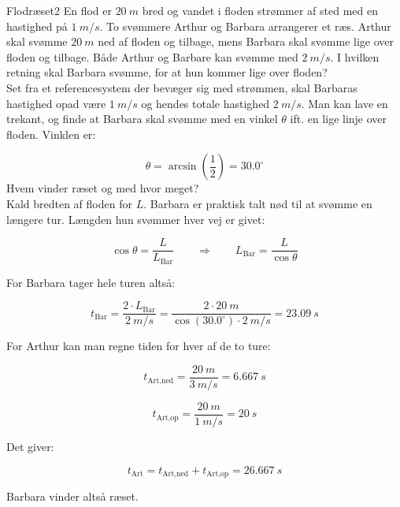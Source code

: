 \documentclass[crop=false, class=memoir]{standalone}
\begin{document}
\begin{opgave}{Flodræset}{2}
	En flod er $\SI{20}{m}$ bred og vandet i floden strømmer af sted med en hastighed på $\SI{1}{m/s}$. To svømmere Arthur og Barbara arrangerer et ræs. Arthur skal svømme $\SI{20}{m}$ ned af floden og tilbage, mens Barbara skal svømme lige over floden og tilbage. Både Arthur og Barbare kan svømme med $\SI{2}{m/s}$.
	\opg I hvilken retning skal Barbara svømme, for at hun kommer lige over floden?\\
	
	Set fra et referencesystem der bevæger sig med strømmen, skal Barbaras hastighed opad være $\SI{1}{m/s}$ og hendes totale hastighed $\SI{2}{m/s}$. Man kan lave en trekant, og finde at Barbara skal svømme med en vinkel $\theta$ ift. en lige linje over floden. Vinklen er:
	
	$$\theta = \arcsin \left( \frac{1}{2} \right) = 30.0^\circ$$
	\opg Hvem vinder ræset og med hvor meget?\\
	
	Kald bredten af floden for $L$. Barbara er praktisk talt nød til at svømme en længere tur. Længden hun svømmer hver vej er givet:
	
	$$\cos \theta = \frac{L}{L_{\text{Bar}}} \quad \quad \Rightarrow \quad \quad L_{\text{Bar}} = \frac{L}{\cos \theta}  $$
	
	\vspace{2mm}
	
	For Barbara tager hele turen altså:
	
	$$t_{\text{Bar}} = \frac{2 \cdot L_{\text{Bar}}}{\SI{2}{m/s}} = \frac{2 \cdot \SI{20}{m}}{\cos \left( 30.0^\circ \right) \cdot \SI{2}{m/s}} = \SI{23.09}{s}$$
	
	\vspace{2mm}
	
	For Arthur kan man regne tiden for hver af de to ture:
	
	$$t_{\text{Art,ned}} = \frac{\SI{20}{m}}{\SI{3}{m/s}} = \SI{6.667}{s}$$
	
	$$t_{\text{Art,op}} = \frac{\SI{20}{m}}{\SI{1}{m/s}} = \SI{20}{s}$$
	
	\vspace{2mm}
	
	Det giver:
	
	$$t_{\text{Art}} = t_{\text{Art,ned}} + t_{\text{Art,op}} = \SI{26.667}{s}$$
	
	\vspace{2mm}
	
	Barbara vinder altså ræset.
\end{opgave}
\end{document}

